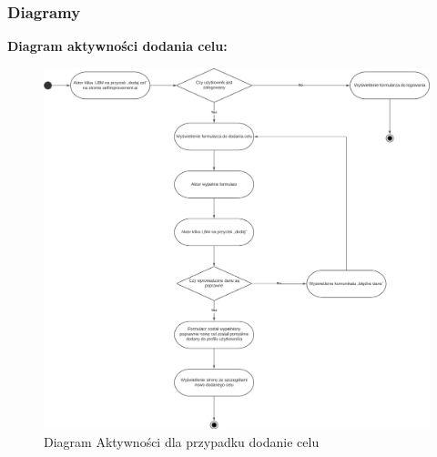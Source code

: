 \subsubsection{Diagramy}

{\noindent \bf Diagram aktywności dodania celu: }
\begin{figure}[h]
    \centering
    \includegraphics[width=1\textwidth]{Obrazy/diagrams/add_goal_activity_diagram.png}
    \caption{Diagram Aktywności dla przypadku dodanie celu}
    \label{fig:my_label}
\end{figure}

\clearpage


